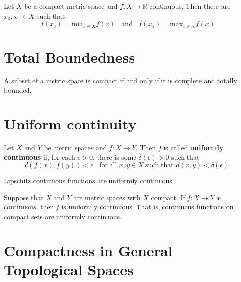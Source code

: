 \begin{theorem}
    Let \(X\) be a compact metric space and \(f \colon X \to \mathbb{R}\) continuous. 
    Then there are \(x_0, x_1 \in X\) such that 
    \[
        f (x_0) = \text{min}_{x \in X} f(x) \:\:\:\: \text{and} \:\:\:\: f(x_1) = \text{max}_{x\in X}f(x)  
    \]
\end{theorem}


\section{Total Boundedness}

\begin{theorem}
    A subset of a metric space is compact if and only if it is complete and totally bounded. 
\end{theorem}

\section{Uniform continuity}

\begin{definition}
    Let \(X\) and \(Y\) be metric spaces and \(f \colon X \to Y\). Then \(f\) is called 
    \textbf{uniformly continuous} if, for each \(\epsilon > 0\), there is some 
    \(\delta \left(\epsilon\right) > 0\) such that 
    \[
        d(f(x), f(y)) < \epsilon \:\:\:\: \text{for all } x,y \in X \: \text{such that } d(x, y) < \delta(\epsilon). 
    \]
\end{definition}

\begin{eg}
    Lipschitz continuous functions are uniformly continuous. 
\end{eg}

\begin{theorem}
    Suppose that \(X\) and \(Y\) are metric spaces with \(X\) compact. If \(f \colon X \to Y\)
    is continuous, then \(f\) is uniformly continuous. That is, continuous functions on 
    compact sets are uniformly continuous. 
\end{theorem}

\section{Compactness in General Topological Spaces}

